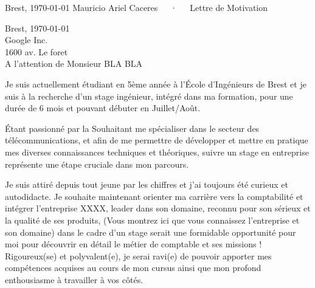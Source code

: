 \documentclass[11pt, a4paper]{awesome-cv}
\begin{document}
\makecvheader[R]

\makecvfooter
  {Brest, \today}
  {Mauricio Ariel Caceres~~~·~~~Lettre de Motivation}
  {}


\begin{flushright}
	Brest, \today \\
	Google Inc.\\
	1600 av. Le foret\\
	A l'attention de Monsieur BLA BLA\\
\end{flushright}
\makelettertitle

\begin{cvletter}
	
Je suis actuellement étudiant en 5ème année à l’École d'Ingénieurs de Brest et je suis à la recherche d’un stage ingénieur, intégré dans ma formation, pour une durée de 6 mois et pouvant débuter en Juillet/Août.

 Étant passionné par la 
 Souhaitant me spécialiser dans le secteur des télécommunications, et afin de me permettre
 de développer et mettre en pratique mes diverses connaissances techniques et théoriques,
 suivre un stage en entreprise représente une étape cruciale dans mon parcours.
 
Je suis attiré depuis tout jeune par les chiffres et j’ai toujours été curieux et autodidacte. Je souhaite maintenant orienter ma carrière vers la comptabilité et intégrer l'entreprise XXXX, leader dans son domaine, reconnu pour son sérieux et la qualité de ses produits, (Vous montrez ici que vous connaissez l'entreprise et son domaine) dans le cadre d'un stage serait une formidable opportunité pour moi pour découvrir en détail le métier de comptable et ses missions !
Rigoureux(se) et polyvalent(e), je serai ravi(e) de pouvoir apporter mes compétences acquises au cours de mon cursus ainsi que mon profond enthousiasme à travailler à vos côtés.


\end{cvletter}


\makeletterclosing
\end{document}
